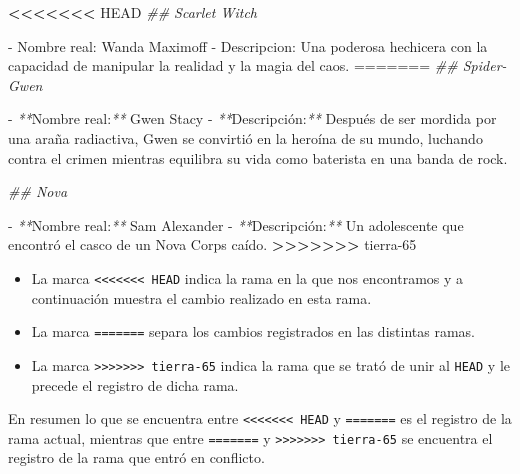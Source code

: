 \documentclass[
]{book}
\newenvironment{Shaded}{\begin{snugshade}}{\end{snugshade}}
\newcommand{\CommentTok}[1]{\textcolor[rgb]{0.56,0.35,0.01}{\textit{#1}}}
\newcommand{\ExtensionTok}[1]{#1}
\newcommand{\NormalTok}[1]{#1}
\newcommand{\OperatorTok}[1]{\textcolor[rgb]{0.81,0.36,0.00}{\textbf{#1}}}
\newcommand{\PreprocessorTok}[1]{\textcolor[rgb]{0.56,0.35,0.01}{\textit{#1}}}
\begin{document}
\begin{Shaded}
\begin{Highlighting}[]
\OperatorTok{\textless{}\textless{}\textless{}\textless{}\textless{}\textless{}\textless{}}\NormalTok{ HEAD}
\CommentTok{\#\# Scarlet Witch}

\ExtensionTok{{-}}\NormalTok{ Nombre real: Wanda Maximoff}
\ExtensionTok{{-}}\NormalTok{ Descripcion: Una poderosa hechicera con la capacidad de manipular la realidad y la magia del caos.}
\ExtensionTok{=======}
\CommentTok{\#\# Spider{-}Gwen}

\ExtensionTok{{-}} \PreprocessorTok{**}\NormalTok{Nombre real:}\PreprocessorTok{**}\NormalTok{ Gwen Stacy}
\ExtensionTok{{-}} \PreprocessorTok{**}\NormalTok{Descripción:}\PreprocessorTok{**}\NormalTok{ Después de ser mordida por una araña radiactiva, Gwen se convirtió en la heroína de su mundo, luchando contra el crimen mientras equilibra su vida como baterista en una banda de rock.}

\CommentTok{\#\# Nova}

\ExtensionTok{{-}} \PreprocessorTok{**}\NormalTok{Nombre real:}\PreprocessorTok{**}\NormalTok{ Sam Alexander}
\ExtensionTok{{-}} \PreprocessorTok{**}\NormalTok{Descripción:}\PreprocessorTok{**}\NormalTok{ Un adolescente que encontró el casco de un Nova Corps caído.}
\OperatorTok{\textgreater{}\textgreater{}\textgreater{}\textgreater{}\textgreater{}\textgreater{}\textgreater{}}\NormalTok{ tierra{-}65}
\end{Highlighting}
\end{Shaded}

\begin{itemize}
\item
  La marca \texttt{\textless{}\textless{}\textless{}\textless{}\textless{}\textless{}\textless{}\ HEAD} indica la rama en la que nos encontramos y a continuación muestra el cambio realizado en esta rama.
\item
  La marca \texttt{=======} separa los cambios registrados en las distintas ramas.
\item
  La marca \texttt{\textgreater{}\textgreater{}\textgreater{}\textgreater{}\textgreater{}\textgreater{}\textgreater{}\ tierra-65} indica la rama que se trató de unir al \texttt{HEAD} y le precede el registro de dicha rama.
\end{itemize}

En resumen lo que se encuentra entre \texttt{\textless{}\textless{}\textless{}\textless{}\textless{}\textless{}\textless{}\ HEAD} y \texttt{=======} es el registro de la rama actual, mientras que entre \texttt{=======} y \texttt{\textgreater{}\textgreater{}\textgreater{}\textgreater{}\textgreater{}\textgreater{}\textgreater{}\ tierra-65} se encuentra el registro de la rama que entró en conflicto.
\end{document}
